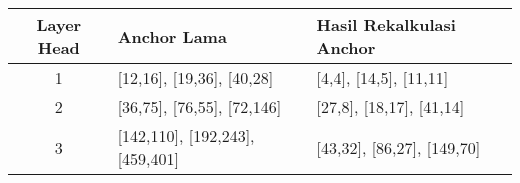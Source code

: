 \begin{table}[H]
  \centering
  \label{tbl:recalculated_anchor}
  \vspace{-1ex}
  \begin{tabular}{ c l l }
    \toprule[1.5pt]
    Layer Head & Anchor Lama        & Hasil Rekalkulasi Anchor\\
    \midrule
    1          & [12,16], [19,36], [40,28]& [4,4], [14,5], [11,11]\\
    2          & [36,75], [76,55], [72,146]& [27,8], [18,17], [41,14]\\
    3          & [142,110], [192,243], [459,401]& [43,32], [86,27], [149,70]\\
    \bottomrule[1.5pt]
  \end{tabular}
\end{table}